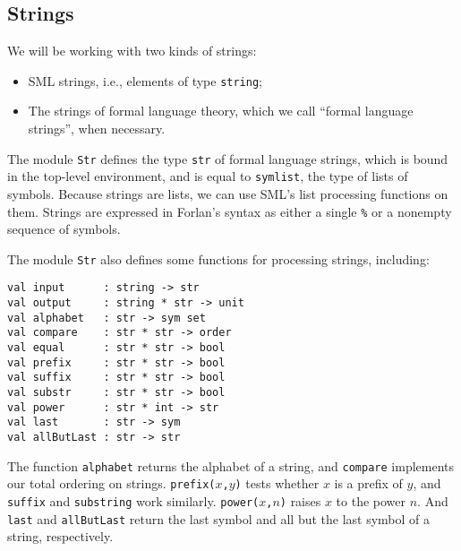 \subsection{Strings}

We will be working with two kinds of strings:
\begin{itemize}
\item SML strings, i.e., elements of type \texttt{string};

\item The strings of formal language theory, which we call
``formal language strings'', when necessary.
\end{itemize}

The module \texttt{Str}
%
defines the type \texttt{str} of formal language
%
%
%
strings, which is bound in the top-level environment, and is
equal to \texttt{sym\;list}, the type of lists of symbols.
Because strings are lists, we can use SML's list processing functions
on them.
Strings are expressed in Forlan's syntax as either a
single \texttt{\%} or a nonempty sequence of symbols.
%
%

The module \texttt{Str} also defines some functions for processing strings,
including:
\begin{verbatim}
val input      : string -> str
val output     : string * str -> unit
val alphabet   : str -> sym set
val compare    : str * str -> order
val equal      : str * str -> bool
val prefix     : str * str -> bool
val suffix     : str * str -> bool
val substr     : str * str -> bool
val power      : str * int -> str
val last       : str -> sym
val allButLast : str -> str
\end{verbatim}
%
%
%
%
%
%
%
%
%
%

The function \texttt{alphabet} returns the alphabet of a string,
and \texttt{compare} implements our total ordering on
strings.  \texttt{prefix($x$,\;$y$)} tests whether $x$ is a prefix of
$y$, and \texttt{suffix} and \texttt{substring} work similarly.
\texttt{power($x$,\;$n$)} raises $x$ to the power $n$.  And
\texttt{last} and \texttt{allButLast} return the last symbol and all
but the last symbol of a string, respectively.

